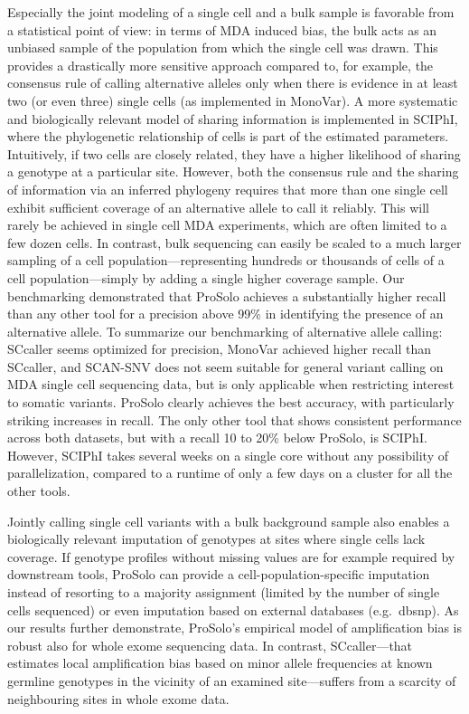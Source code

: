 \documentclass[fleqn,12pt,inline]{wlscirep}
\begin{document}
Especially the joint modeling of a single cell and a bulk sample is favorable from a statistical point of view: in terms of MDA induced bias, the bulk acts as an unbiased sample of the population from which the single cell was drawn.
This provides a drastically more sensitive approach compared to, for example, the consensus rule of calling alternative alleles only when there is evidence in at least two (or even three) single cells (as implemented in MonoVar\cite{zafar_monovar:_2016}).
A more systematic and biologically relevant model of sharing information is implemented in SCIPhI, where the phylogenetic relationship of cells is part of the estimated parameters.
Intuitively, if two cells are closely related, they have a higher likelihood of sharing a genotype at a particular site.
However, both the consensus rule and the sharing of information via an inferred phylogeny requires that more than one single cell exhibit sufficient coverage of an alternative allele to call it reliably.
This will rarely be achieved in single cell MDA experiments, which are often limited to a few dozen cells.
In contrast, bulk sequencing can easily be scaled to a much larger sampling of a cell population---representing hundreds or thousands of cells of a cell population---simply by adding a single higher coverage sample.
Our benchmarking demonstrated that ProSolo achieves a substantially higher recall than any other tool for a precision above 99\% in identifying the presence of an alternative allele.
To summarize our benchmarking of alternative allele calling: SCcaller seems optimized for precision, MonoVar achieved higher recall than SCcaller, and SCAN-SNV does not seem suitable for general variant calling on MDA single cell sequencing data, but is only applicable when restricting interest to somatic variants.
ProSolo clearly achieves the best accuracy, with particularly striking increases in recall. 
The only other tool that shows consistent performance across both datasets, but with a recall 10 to 20\% below ProSolo, is SCIPhI.
However, SCIPhI takes several weeks on a single core without any possibility of parallelization, compared to a runtime of only a few days on a cluster for all the other tools.

Jointly calling single cell variants with a bulk background sample also enables a biologically relevant imputation of genotypes at sites where single cells lack coverage.
If genotype profiles without missing values are for example required by downstream tools, ProSolo can provide a cell-population-specific imputation instead of resorting to a majority assignment (limited by the number of single cells sequenced) or even imputation based on external databases (e.g.~dbsnp).
As our results further demonstrate, ProSolo’s empirical model of amplification bias is robust also for whole exome sequencing data. 
In contrast, SCcaller---that estimates local amplification bias based on minor allele frequencies at known germline genotypes in the vicinity of an examined site---suffers from a scarcity of neighbouring sites in whole exome data.
\end{document}
